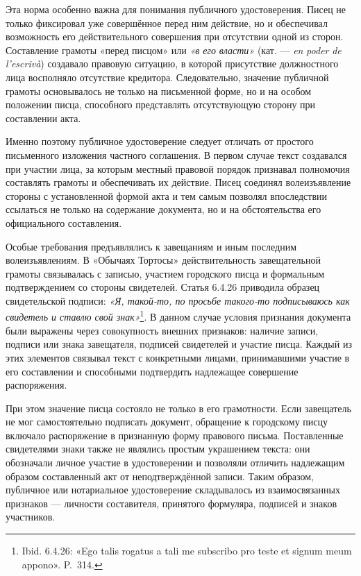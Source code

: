 Эта норма особенно важна для понимания публичного удостоверения. Писец не только фиксировал уже совершённое перед ним действие, но и обеспечивал возможность его действительного совершения при отсутствии одной из сторон. Составление грамоты «перед писцом» или \emph{«в его }\emph{власти» }(кат. --- \emph{en}\emph{ }\emph{poder}\emph{ de }\emph{l’escrivà}) создавало правовую ситуацию, в которой присутствие должностного лица восполняло отсутствие кредитора. Следовательно, значение публичной грамоты основывалось не только на письменной форме, но и на особом положении писца, способного представлять отсутствующую сторону при составлении акта.

Именно поэтому публичное удостоверение следует отличать от простого письменного изложения частного соглашения. В первом случае текст создавался при участии лица, за которым местный правовой порядок признавал полномочия составлять грамоты и обеспечивать их действие. Писец соединял волеизъявление стороны с установленной формой акта и тем самым позволял впоследствии ссылаться не только на содержание документа, но и на обстоятельства его официального составления.

Особые требования предъявлялись к завещаниям и иным последним волеизъявлениям. В «Обычаях Тортосы» действительность завещательной грамоты связывалась с записью, участием городского писца и формальным подтверждением со стороны свидетелей. Статья 6.4.26 приводила образец свидетельской подписи: \emph{«Я, такой-то, по просьбе такого-то подписываюсь как свидетель и ставлю свой знак»}\footnote{Ibid. 6.4.26: «Ego talis rogatus a tali me subscribo pro teste et signum meum appono». P.~314.}. В данном случае условия признания документа были выражены через совокупность внешних признаков: наличие записи, подписи или знака завещателя, подписей свидетелей и участие писца. Каждый из этих элементов связывал текст с конкретными лицами, принимавшими участие в его составлении и способными подтвердить надлежащее совершение распоряжения.

При этом значение писца состояло не только в его грамотности. Если завещатель не мог самостоятельно подписать документ, обращение к городскому писцу включало распоряжение в признанную форму правового письма. Поставленные свидетелями знаки также не являлись простым украшением текста: они обозначали личное участие в удостоверении и позволяли отличить надлежащим образом составленный акт от неподтверждённой записи. Таким образом, публичное или нотариальное удостоверение складывалось из взаимосвязанных признаков --- личности составителя, принятого формуляра, подписей и знаков участников.

